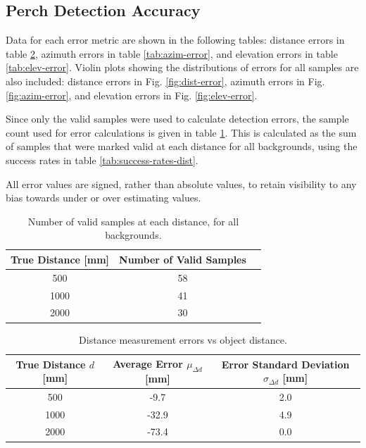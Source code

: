 \subsection{Perch Detection Accuracy} \label{sec:results:perch-accuracy}

Data for each error metric are shown in the following tables: distance errors in table \ref{tab:dist-error}, azimuth errors 
in table \ref{tab:azim-error}, and elevation errors in table \ref{tab:elev-error}.
Violin plots showing the distributions of errors for all samples are also included: distance errors in Fig. \ref{fig:dist-error}, azimuth errors 
in Fig. \ref{fig:azim-error}, and elevation errors in Fig. \ref{fig:elev-error}.

Since only the valid samples were used to calculate detection errors, the sample count used for error calculations is given in
table \ref{tab:error-sample-counts}. This is calculated as the sum of samples that 
were marked valid at each distance for all backgrounds, using the success rates in table \ref{tab:success-rates-dist}.

All error values are signed, rather than absolute values, to retain visibility to any bias towards under or over estimating
values.


\begin{table}[H]
    \centering
    \caption{Number of valid samples at each distance, for all backgrounds.}
    \label{tab:error-sample-counts}
    \begin{tabular}{|c||c|c|}
        \hline
        True Distance [mm] & Number of Valid Samples\\
        \hline
        500 & 58 \\
        1000 & 41 \\
        2000 & 30 \\
        \hline
    \end{tabular}
\end{table}

\begin{table}[H]
    \centering
    \caption{Distance measurement errors vs object distance.}
    \label{tab:dist-error}
    \begin{tabular}{|c||c|c|}
        \hline
        True Distance $d$ [mm] & Average Error $\mu_{\Delta d}$ [mm] & Error Standard Deviation $\sigma_{\Delta d}$ [mm]\\
        \hline
        500 & -9.7 & 2.0 \\
        1000 & -32.9 & 4.9 \\
        2000 & -73.4 & 0.0 \\
        \hline
    \end{tabular}
\end{table}

